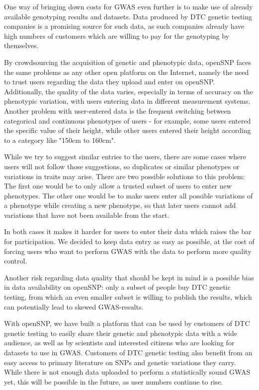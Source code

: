 \documentclass[10pt]{article}
\begin{document}
One way of bringing down costs for GWAS even further is to make use of already available genotyping results and datasets. 
Data produced by DTC genetic testing companies is a promising source for such data, as such companies already have high 
numbers of customers which are willing to pay for the genotyping by themselves.

By crowdsourcing the acquisition of genetic and phenotypic data, openSNP faces the same problems as any other 
open platform on the Internet, namely the need to trust users regarding the data they upload and enter on openSNP. 
Additionally, the quality of the data varies, especially in terms of accuracy on the phenotypic variation, 
with users entering data in different measurement systems. Another problem with user-entered data is the frequent switching between categorical and continuous phenotypes of users - for example, some users entered the specific value of their height, while other users entered their height according to a category like "150cm to 160cm". 

While we try to suggest similar entries to the users, 
there are some cases where users will not follow those suggestions, so duplicates or similar phenotypes or variations in traits may arise. There are two possible solutions to this problem: The first one would be to only allow a trusted subset of users to enter new phenotypes. The other one 
would be to make users enter all possible variations of a phenotype while creating a new phenotype, so that later users cannot add 
variations that have not been available from the start. 

In both cases it makes it harder 
for users to enter their data which raises the bar for participation.
We decided to keep data entry as easy as possible, at the cost of forcing users who want to perform GWAS with the data to perform more quality control.

Another risk regarding data quality that should be kept in mind is a possible bias in data availability on openSNP: only a subset of people buy DTC genetic testing, from which an even smaller subset is willing to publish the results, which can potentially lead to skewed GWAS-results.

With openSNP, we have built a platform that can be used by customers of DTC genetic testing to easily share their genetic and phenotypic 
data with a wide audience, as well as by scientists and interested citizens who are looking for datasets to use in GWAS. 
Customers of DTC genetic testing also benefit from an easy access to primary literature on SNPs and genetic variations they carry. 
While there is not enough data uploaded to perform a statistically sound GWAS yet, this will be possible in the future, as user numbers continue to rise.
\end{document}
